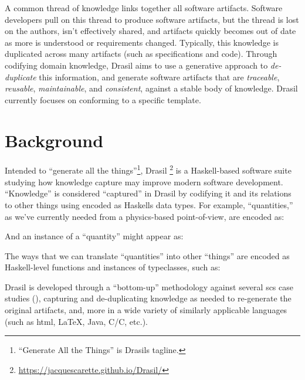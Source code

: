       A common thread of knowledge links together all software artifacts.
      Software developers pull on this thread to produce software artifacts, but
      the thread is lost on the authors, isn't effectively shared, and artifacts
      quickly becomes out of date as more is understood or requirements changed.
      Typically, this knowledge is duplicated across many artifacts (such as
      specifications and code). Through codifying domain knowledge,
      Drasil\cite{Drasil2021} aims to use a generative approach to
      \textit{de-duplicate} this information, and generate software artifacts
      that are \textit{traceable}, \textit{reusable}, \textit{maintainable}, and
      \textit{consistent}, against a stable body of knowledge. Drasil currently
      focuses on  conforming to a specific 
      template\cite{SmithAndLai2005}.
\fi

\section{Background}
\label{sec:intro:background}

Intended to ``generate all the things''\footnote{``Generate All the Things'' is
      Drasils tagline.}, Drasil
\footnote{\url{https://jacquescarette.github.io/Drasil/}} is a Haskell-based
\cite{Haskell2010} software suite studying how knowledge capture may improve
modern software development. ``Knowledge'' is considered ``captured'' in Drasil
by codifying it and its relations to other things using  encoded as
Haskells data types. For example, ``quantities,'' as we've currently needed from
a physics-based point-of-view, are encoded as:


And an instance of a ``quantity'' might appear as:


The ways that we can translate ``quantities'' into other ``things'' are encoded
as Haskell-level functions and instances of typeclasses, such as:


Drasil is developed through a ``bottom-up'' methodology against several
\acs{scs} case studies (), capturing and de-duplicating
knowledge as needed to re-generate the original artifacts, and, more in a wide
variety of similarly applicable languages (such as \acs{html}, \LaTeX{}, Java,
C/C\+\+, etc.).

